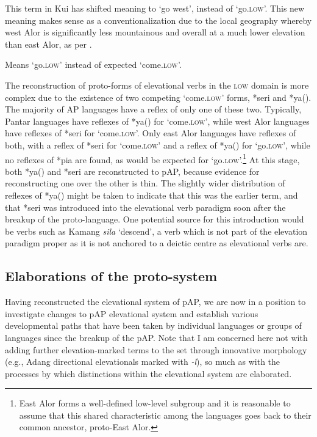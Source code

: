 \begin{table}
{\dag} This term in Kui has shifted meaning to `go west', instead of `go.\textsc{low}'. This new meaning makes sense as a conventionalization due to the local geography whereby west Alor is significantly less mountainous and overall at a much lower elevation than east Alor, as per \citet{Windschuttel2013}.

{\ddag} Means `go.\textsc{low}' instead of expected `come.\textsc{low}'.
\end{table}

The reconstruction of proto-forms of elevational verbs in the \textsc{low} domain is more complex due to the existence of two competing `come.\textsc{low}' forms, *seri and *ya({\ng}). The majority of AP languages have a reflex of only one of these two. Typically, Pantar languages have reflexes of *ya({\ng}) for `come.\textsc{low}', while west Alor languages have reflexes of *seri for `come.\textsc{low}'. Only east Alor languages have reflexes of both, with a reflex of *seri for `come.\textsc{low}' and a reflex of *ya({\ng}) for `go.\textsc{low}', while no reflexes of *pia are found, as would be expected for `go.\textsc{low}'.\footnote{East Alor forms a well-defined low-level subgroup and it is reasonable to assume that this shared characteristic among the languages goes back to their common ancestor, proto-East Alor.} At this stage, both *ya({\ng}) and *seri are reconstructed to pAP, because evidence for reconstructing one over the other is thin. The slightly wider distribution of reflexes of *ya({\ng}) might be taken to indicate that this was the earlier term, and that *seri was introduced into the elevational verb paradigm soon after the breakup of the proto-language. One potential source for this introduction would be verbs such as Kamang \textit{sila}\textit{{\ng}} `descend', a verb which is not part of the elevation paradigm proper as it is not anchored to a deictic centre as elevational verbs are. 

\subsection{Elaborations of the proto-system}\label{sec:7:4.3}
Having reconstructed the elevational system of pAP, we are now in a position to investigate changes to pAP elevational system and establish various developmental paths that have been taken by individual languages or groups of languages since the breakup of the pAP. Note that I am concerned here not with adding further elevation-marked terms to the set through innovative morphology (e.g., Adang directional elevationals marked with \textit{{}-}\textit{l}\textit{{\textepsilon}}), so much as with the processes by which distinctions within the elevational system are elaborated. 

